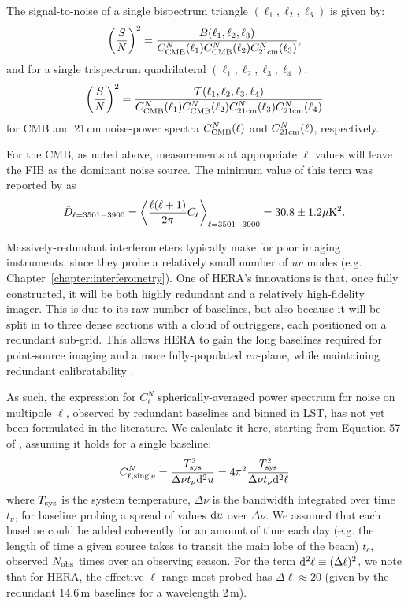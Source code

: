 The signal-to-noise of a single bispectrum triangle $(\ell_1, \ell_2, \ell_3)$ is given by: 
\begin{equation}
\left(\frac{S}{N}\right)^2 = \frac{B(\ell_1, \ell_2, \ell_3)}{C_{\rm CMB}^N(\ell_1)C_{\rm CMB}^N(\ell_2)C_{\rm 21cm}^N(\ell_3)},
\end{equation}
and for a single trispectrum quadrilateral $(\ell_1, \ell_2, \ell_3, \ell_4)$:
\begin{equation}
\left(\frac{S}{N}\right)^2 = \frac{\mathcal{T}(\ell_1, \ell_2, \ell_3, \ell_4)}{C_{\rm CMB}^N(\ell_1)C_{\rm CMB}^N(\ell_2)C_{\rm 21cm}^N(\ell_3)C_{\rm 21cm}^N(\ell_4)}
\end{equation}
for CMB and 21\,cm noise-power spectra $C_{\rm CMB}^N(\ell)$ and $C_{\rm 21cm}^N(\ell)$, respectively.

For the CMB, as noted above, measurements at appropriate $\ell$ values will leave the FIB as the dominant noise source. The minimum value of this term was reported by \cite{George.15} as 
\begin{equation}
\hat{D}_{\ell = 3501 - 3900} = \left\langle \frac{\ell(\ell+1)}{2\pi}C_{\ell} \right\rangle_{\ell = 3501 - 3900} = 30.8\pm 1.2\mu {\rm K}^2.
\end{equation}

Massively-redundant interferometers typically make for poor imaging instruments, since they probe a relatively small number of $uv$ modes (e.g. Chapter~\ref{chapter:interferometry}). One of HERA's innovations is that, once fully constructed, it will be both highly redundant and a relatively high-fidelity imager. This is due to its raw number of baselines, but also because it will be split in to three dense sections with a cloud of outriggers, each positioned on a redundant sub-grid. This allows HERA to gain the long baselines required for point-source imaging and a more fully-populated $uv$-plane, while maintaining redundant calibratability \citep{Dillon.16, deBoer.17}.

As such, the expression for $C^N_{\ell}$ spherically-averaged power spectrum for noise on multipole $\ell$, observed by redundant baselines and binned in LST, has not yet been formulated in the literature. We calculate it here, starting from Equation 57 of \cite{Zaldarriaga.04}, assuming it holds for a single baseline:
\begin{equation}
C^N_{\ell, {\rm single}} = \frac{T_{\rm sys}^2}{\Delta\nu t_{\nu} {\rm d}^2 u} = 4\pi^2 \frac{T_{\rm sys}^2}{\Delta\nu t_{\nu} {\rm d}^2 \ell}
\end{equation}
where $T_{\rm sys}$ is the system temperature, $\Delta\nu$ is the bandwidth integrated over time $t_{\nu}$, for baseline probing a spread of values ${\rm d}u$ over $\Delta\nu$.
We assumed that each baseline could be added coherently for an amount of time each day (e.g. the length of time a given source takes to transit the main lobe of the beam) $t_c$, observed $N_{\rm obs}$ times over an observing season. 
For the term ${\rm d}^2\ell \equiv (\Delta\ell)^2$, we note that for HERA, the effective $\ell$ range most-probed has $\Delta\ell\approx 20$ (given by the redundant 14.6\,m baselines for a wavelength 2\,m). 

